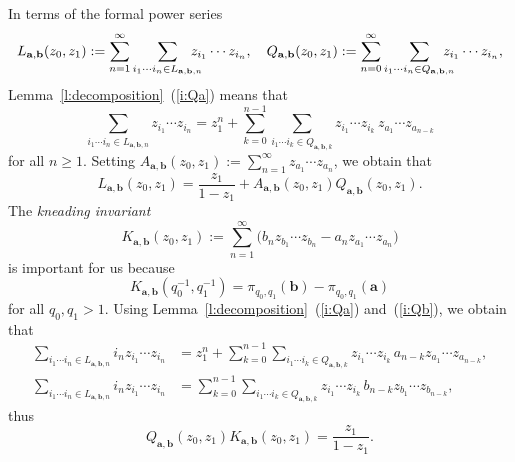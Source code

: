 \documentclass{amsart}
\theoremstyle{definition}
\numberwithin{equation}{section}
\newcommand{\ba}{\mathbf{a}}
\newcommand{\bb}{\mathbf{b}}
\begin{document}
In terms of the formal power series
\[
L_{\ba,\bb}(z_0,z_1) := \sum_{n=1}^\infty \sum_{i_1\cdots i_n \in L_{\ba,\bb,n}} \hspace{-1em} z_{i_1} \cdots z_{i_ n}, \quad Q_{\ba,\bb}(z_0,z_1) := \sum_{n=0}^\infty \sum_{i_1\cdots i_n \in Q_{\ba,\bb,n}} \hspace{-1em} z_{i_1} \cdots z_{i_n},
\]
Lemma~\ref{l:decomposition}~(\ref{i:Qa}) means that
\[
\sum_{i_1\cdots i_n \in L_{\ba,\bb,n}} z_{i_1} \cdots z_{i_ n} = z_1^n + \sum_{k=0}^{n-1} \sum_{i_1\cdots i_k \in Q_{\ba,\bb,k}} z_{i_1} \cdots z_{i_k}\, z_{a_1} \cdots z_{a_{n-k}}
\]
for all $n \ge 1$.
Setting $A_{\ba,\bb}(z_0,z_1) := \sum_{n=1}^\infty z_{a_1}\cdots z_{a_n}$, we obtain that
\begin{equation} \label{e:LAQ}
L_{\ba,\bb}(z_0,z_1) = \frac{z_1}{1{-}z_1} + A_{\ba,\bb}(z_0,z_1) Q_{\ba,\bb}(z_0,z_1).
\end{equation}
The \emph{kneading invariant}
\begin{equation*} \label{e:K}
K_{\ba,\bb}(z_0,z_1) := \sum_{n=1}^\infty \big(b_n z_{b_1} \cdots z_{b_n} -  a_n z_{a_1} \cdots z_{a_n}\big)
\end{equation*}
is important for us because
\[
K_{\ba,\bb}(q_0^{-1}\!,q_1^{-1}) = \pi_{q_0,q_1}(\bb) - \pi_{q_0,q_1}(\ba)
\]
for all $q_0,q_1 > 1$.
Using Lemma~\ref{l:decomposition}~(\ref{i:Qa}) and~(\ref{i:Qb}), we obtain that
\[
\begin{aligned}
\sum_{i_1\cdots i_n \in L_{\ba,\bb,n}} i_n z_{i_1} \cdots z_{i_ n} & = z_1^n + \sum_{k=0}^{n-1} \sum_{i_1\cdots i_k \in Q_{\ba,\bb,k}} z_{i_1} \cdots z_{i_k}\, a_{n-k} z_{a_1} \cdots z_{a_{n-k}}, \\
\sum_{i_1\cdots i_n \in L_{\ba,\bb,n}} i_n z_{i_1} \cdots z_{i_ n} & = \sum_{k=0}^{n-1} \sum_{i_1\cdots i_k \in Q_{\ba,\bb,k}} z_{i_1} \cdots z_{i_k}\, b_{n-k} z_{b_1} \cdots z_{b_{n-k}},
\end{aligned}
\]
thus
\begin{equation} \label{e:QK}
Q_{\ba,\bb}(z_0,z_1) K_{\ba,\bb}(z_0,z_1) = \frac{z_1}{1-z_1}.
\end{equation}
\end{document}
